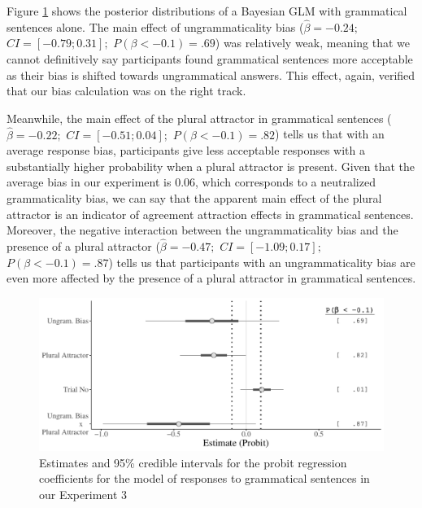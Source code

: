 Figure \ref{fig:GrammaticalBayesianGLM} shows the posterior distributions of a Bayesian GLM with grammatical sentences alone. The main effect of ungrammaticality bias ($\hat{\beta}=-0.24;$ $CI=[-0.79; 0.31];$ $P(\beta< -0.1)=    .69$) was relatively weak, meaning that we cannot definitively say participants found grammatical sentences more acceptable as their bias is shifted towards ungrammatical answers. This effect, again, verified that our bias calculation was on the right track. 

Meanwhile, the main effect of the plural attractor in grammatical sentences ($\hat{\beta}=-0.22;$ $CI=[-0.51; 0.04];$ $P(\beta< -0.1)=    .82$) tells us that with an average response bias, participants give less acceptable responses with a substantially higher probability when a plural attractor is present. Given that the average bias in our experiment is 0.06, which corresponds to a neutralized grammaticality bias, we can say that the apparent main effect of the plural attractor is an indicator of agreement attraction effects in grammatical sentences. Moreover, the negative interaction between the ungrammaticality bias and the presence of a plural attractor ($\hat{\beta}=-0.47;$ $CI=[-1.09; 0.17];$ $P(\beta< -0.1)=    .87$) tells us that participants with an ungrammaticality bias are even more affected by the presence of a plural attractor in grammatical sentences. 

\begin{knitrout}
\color{fgcolor}\begin{figure}[hbt!]

{\centering \includegraphics[width=\linewidth]{figure/GrammaticalBayesianGLM-1} 

}

\caption{Estimates and 95\% credible intervals for the probit regression coefficients for the model of responses to grammatical sentences in our Experiment 3}\label{fig:GrammaticalBayesianGLM}
\end{figure}

\end{knitrout}

